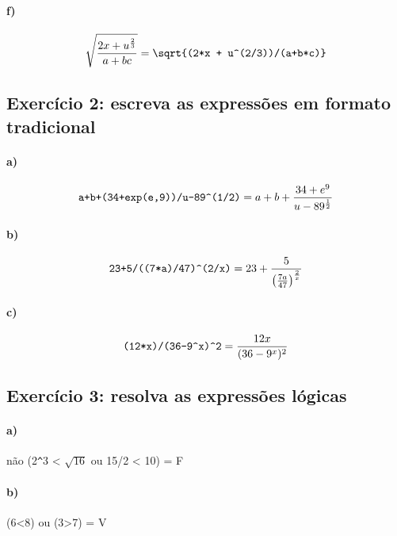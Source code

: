 \documentclass[pdftex,a4paper,12pt,brazil]{article} %
\begin{document}
\paragraph{f)} $$\sqrt{\frac{2x + u^{\frac{2}{3}}}{a + bc}} = \verb!\sqrt{(2*x + u^(2/3))/(a+b*c)}!$$


\subsection{Exercício 2: escreva as expressões em formato tradicional}
\label{grupo_2}

\paragraph{a)} $$\verb!a+b+(34+exp(e,9))/u-89^(1/2)! = a + b + \frac{34+e^9}{u-89^{\frac{1}{2}}}$$

\paragraph{b)} $$\verb!23+5/((7*a)/47)^(2/x)! = 23 + \frac{5}{\left(\frac{7a}{47}\right)^{\frac{2}{x}}} $$

\paragraph{c)} $$\verb!(12*x)/(36-9^x)^2! = \frac{12x}{(36-9^x)^2}$$


\subsection{Exercício 3: resolva as expressões lógicas}
\label{grupo_3}

\paragraph{a)} não (2\verb!^!3 < $\sqrt{16}$ ou 15/2 < 10) = F

\paragraph{b)} (6<8) ou (3>7) = V
\end{document}
